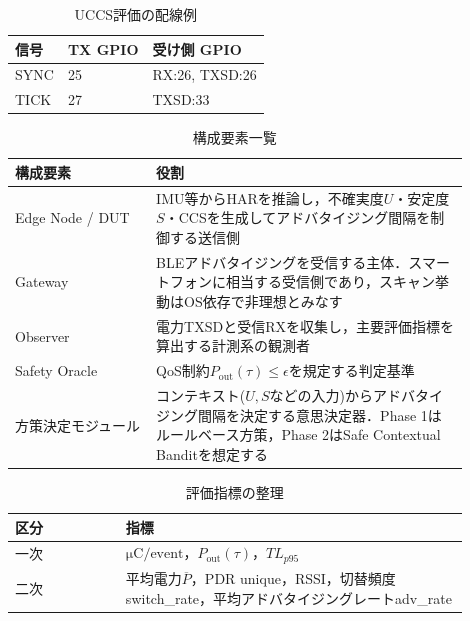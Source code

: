 \documentclass[a4paper,12pt]{ltjsreport}
\begin{document}
\clearpage
\clearpage
\begin{table}[tb]
  \centering
  \caption{UCCS評価の配線例}
  \label{tab:wiring_example}
  \begin{tabular}{lll}
    \toprule
    信号 & TX GPIO & 受け側 GPIO \\
    \midrule
    SYNC & 25 & RX:26, TXSD:26 \\
    TICK & 27 & TXSD:33 \\
    \bottomrule
  \end{tabular}
\end{table}
\clearpage
\clearpage
\begin{table}[tb]
  \centering
  \caption{構成要素一覧}
  \label{tab:actors}
  \begin{tabular}{p{0.28\linewidth}p{0.62\linewidth}}
    \toprule
    構成要素 & 役割 \\
    \midrule
    Edge Node / DUT & IMU等からHARを推論し，不確実度$U$・安定度$S$・CCSを生成してアドバタイジング間隔を制御する送信側 \\
    Gateway & BLEアドバタイジングを受信する主体．スマートフォンに相当する受信側であり，スキャン挙動はOS依存で非理想とみなす \\
    Observer & 電力TXSDと受信RXを収集し，主要評価指標を算出する計測系の観測者 \\
    Safety Oracle & QoS制約$P_{\mathrm{out}}(\tau)\le\epsilon$を規定する判定基準 \\
    方策決定モジュール & コンテキスト($U,S$などの入力)からアドバタイジング間隔を決定する意思決定器．Phase 1はルールベース方策，Phase 2はSafe Contextual Banditを想定する \\
    \bottomrule
  \end{tabular}
\end{table}
\clearpage
\clearpage
\begin{table}[tb]
  \centering
  \caption{評価指標の整理}
  \label{tab:kpi}
  \begin{tabular}{p{0.22\linewidth}p{0.68\linewidth}}
    \toprule
    区分 & 指標 \\
    \midrule
    一次 & $\si{\micro\coulomb}/\text{event}$，$P_{\mathrm{out}}(\tau)$，$TL_{p95}$ \\
    二次 & 平均電力$\overline{P}$，PDR unique，RSSI，切替頻度switch\_rate，平均アドバタイジングレートadv\_rate \\
    \bottomrule
  \end{tabular}
\end{table}
\clearpage
\clearpage
\end{document}
